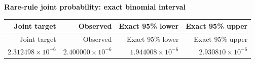 
\begingroup\small
\setlength{\tabcolsep}{4pt}
\noindent\textbf{Rare-rule joint probability: exact binomial interval}
\begin{longtable}{rrrr}
\toprule
Joint target & Observed & Exact 95\% lower & Exact 95\% upper \\
\midrule
\endfirsthead
Joint target & Observed & Exact 95\% lower & Exact 95\% upper \\
\midrule
\endhead
\bottomrule
\endfoot
$2.312498\times10^{-6}$ & $2.400000\times10^{-6}$ & $1.944008\times10^{-6}$ & $2.930810\times10^{-6}$ \\
\end{longtable}
\endgroup
